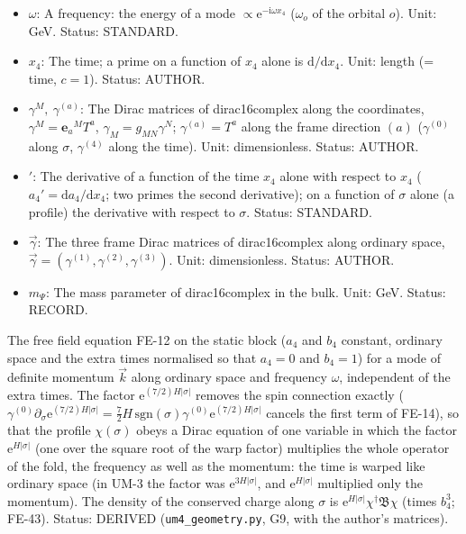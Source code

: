 \documentclass[
  10pt,
]{article}
\begin{document}
\begin{itemize}
\item
  \(\omega\): A frequency: the energy of a mode
  \(\propto \mathrm{e}^{-\mathrm{i}\omega x_4}\) (\(\omega_o\) of the
  orbital \(o\)). Unit: GeV. Status: STANDARD.
\item
  \(x_4\): The time; a prime on a function of \(x_4\) alone is
  \(\mathrm{d}/\mathrm{d}x_4\). Unit: length (= time, \(c = 1\)).
  Status: AUTHOR.
\item
  \(\gamma^M,\ \gamma^{(a)}\): The Dirac matrices of dirac16complex
  along the coordinates, \(\gamma^M = \mathbf{e}_a{}^MT^a\),
  \(\gamma_M = g_{MN}\gamma^N\); \(\gamma^{(a)} = T^a\) along the frame
  direction \((a)\) (\(\gamma^{(0)}\) along \(\sigma\), \(\gamma^{(4)}\)
  along the time). Unit: dimensionless. Status: AUTHOR.
\item
  \({}'\): The derivative of a function of the time \(x_4\) alone with
  respect to \(x_4\) (\(a_4' = \mathrm{d}a_4/\mathrm{d}x_4\); two primes
  the second derivative); on a function of \(\sigma\) alone (a profile)
  the derivative with respect to \(\sigma\). Status: STANDARD.
\item
  \(\vec\gamma\): The three frame Dirac matrices of dirac16complex along
  ordinary space,
  \(\vec\gamma = (\gamma^{(1)}, \gamma^{(2)}, \gamma^{(3)})\). Unit:
  dimensionless. Status: AUTHOR.
\item
  \(m_\Psi\): The mass parameter of dirac16complex in the bulk. Unit:
  GeV. Status: RECORD.
\end{itemize}

The free field equation FE-12 on the static block (\(a_4\) and \(b_4\)
constant, ordinary space and the extra times normalised so that
\(a_4 = 0\) and \(b_4 = 1\)) for a mode of definite momentum \(\vec k\)
along ordinary space and frequency \(\omega\), independent of the extra
times. The factor \(\mathrm{e}^{(7/2)H\lvert\sigma\rvert}\) removes the
spin connection exactly
(\(\gamma^{(0)}\partial_\sigma \mathrm{e}^{(7/2)H\lvert\sigma\rvert} = \frac72H\,\mathrm{sgn}(\sigma)\gamma^{(0)}\mathrm{e}^{(7/2)H\lvert\sigma\rvert}\)
cancels the first term of FE-14), so that the profile \(\chi(\sigma)\)
obeys a Dirac equation of one variable in which the factor
\(\mathrm{e}^{H\lvert\sigma\rvert}\) (one over the square root of the
warp factor) multiplies the whole operator of the fold, the frequency as
well as the momentum: the time is warped like ordinary space (in UM-3
the factor was \(\mathrm{e}^{3H\lvert\sigma\rvert}\), and
\(\mathrm{e}^{H\lvert\sigma\rvert}\) multiplied only the momentum). The
density of the conserved charge along \(\sigma\) is
\(\mathrm{e}^{H\lvert\sigma\rvert}\chi^\dagger\mathfrak{B}\chi\) (times
\(b_4^3\); FE-43). Status: DERIVED (\texttt{um4\_geometry.py}, G9, with
the author's matrices).
\end{document}
